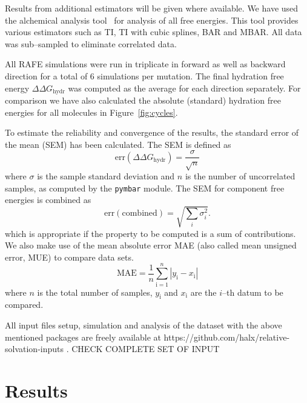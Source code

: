 \documentclass[journal=jctcce,manuscript=article]{achemso}
\begin{document}
Results from additional estimators will be given where available.  We have used 
the alchemical analysis tool~\cite{klimovich_guidelines_2015} for analysis of 
all free energies.  This tool provides various estimators such as TI, TI with 
cubic splines, BAR and MBAR.  All data was sub--sampled to eliminate correlated 
data.

All RAFE simulations were run in triplicate in forward as well as
backward direction for a total of 6 simulations per mutation.  The
final hydration free energy $\Delta\Delta G_{\mathrm{hydr}}$ was
computed as the average for each direction separately.  For comparison we have also calculated the absolute (standard) hydration free energies for all molecules in Figure~\ref{fig:cycles}.

To estimate the reliability and convergence of the results, the
standard error of the mean (SEM) has been calculated.  The SEM is
defined as
\begin{equation}
  \label{eq:sem}
  \mathrm{err}(\Delta\Delta G_{\mathrm{hydr}}) = \frac{\sigma}{\sqrt{n}}
\end{equation}
where $\sigma$ is the sample standard deviation and $n$ is the number of uncorrelated samples, as computed by the \texttt{pymbar} module.
  The SEM for component free energies is combined as
\begin{equation}
  \label{eq:sem-comb}
  \mathrm{err}(\mathrm{combined}) = \sqrt{\sum_i \sigma_i^2}.
\end{equation}
which is appropriate if the property to be computed is a sum of
contributions.
We also make use of the mean absolute error MAE (also called mean unsigned 
error, MUE) to compare data sets.
\begin{equation}
\label{eq:MUE}
\mathrm{MAE} = \frac{1}{n}\sum_\mathrm{i=1}^n \left | y_\mathrm{i} - 
x_\mathrm{i} \right |
\end{equation}
where $n$ is the total number of samples, $y_\mathrm{i}$ and $x_\mathrm{i}$ are 
the $i$--th datum to be compared.


All input files setup, simulation and analysis of the dataset with the above mentioned packages are freely available at 
https://github.com/halx/relative-solvation-inputs .
{\color{red} CHECK COMPLETE SET OF INPUT} 


\section{Results}
\label{sec:results}
\end{document}
